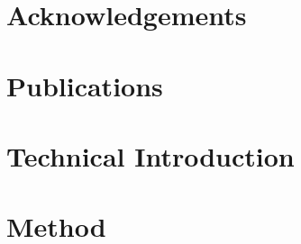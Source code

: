 \documentclass[a4paper]{report}
\begin{document}

\chapter*{Acknowledgements}

\chapter*{Publications}

\begin{abstract}
\end{abstract}

\tableofcontents

\listoffigures

\listoftables








\chapter{Technical Introduction}
\label{ch:techintro}

\chapter{Method}
\label{ch:method}
\end{document}
